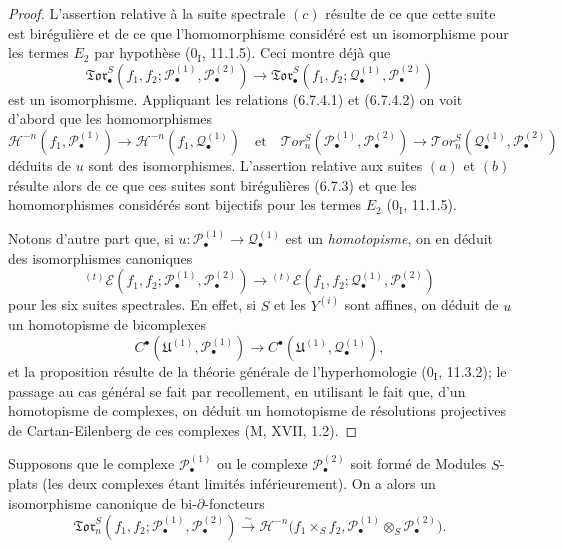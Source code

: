 \begin{proof}
L'assertion relative à la suite spectrale $(c)$ résulte de ce que cette suite
est birégulière et de ce que l'homomorphisme considéré est un isomorphisme pour
les termes $E_2$ par hypothèse ($0_{\mathrm I}$, 11.1.5). Ceci montre déjà que
\[
  \mathfrak{Tor}_\bullet^S
  (f_1,f_2;\mathscr P_\bullet^{(1)},\mathscr P_\bullet^{(2)})
  \longrightarrow
  \mathfrak{Tor}_\bullet^S
  (f_1,f_2;\mathscr Q_\bullet^{(1)},\mathscr P_\bullet^{(2)})
\]
est un isomorphisme. Appliquant les relations (6.7.4.1) et (6.7.4.2) on voit
d'abord que les homomorphismes
\[
  \mathscr H^{-n}(f_1,\mathscr P_\bullet^{(1)})
  \longrightarrow
  \mathscr H^{-n}(f_1,\mathscr Q_\bullet^{(1)})
  \quad\text{et}\quad
  \mathscr{T}\!or_n^S
  (\mathscr P_\bullet^{(1)},\mathscr P_\bullet^{(2)})
  \longrightarrow
  \mathscr{T}\!or_n^S
  (\mathscr Q_\bullet^{(1)},\mathscr P_\bullet^{(2)})
\]
déduits de $u$ sont des isomorphismes. L'assertion relative aux suites $(a)$
et $(b)$ résulte alors de ce que ces suites sont birégulières (6.7.3) et que
les homomorphismes considérés sont bijectifs pour les termes $E_2$
($0_{\mathrm I}$, 11.1.5).

Notons d'autre part que, si
$u:\mathscr P_\bullet^{(1)}\to\mathscr Q_\bullet^{(1)}$ est un
\emph{homotopisme}, on en déduit des isomorphismes canoniques
\[
  {}^{(t)}\mathscr E
  (f_1,f_2;\mathscr P_\bullet^{(1)},\mathscr P_\bullet^{(2)})
  \longrightarrow
  {}^{(t)}\mathscr E
  (f_1,f_2;\mathscr Q_\bullet^{(1)},\mathscr P_\bullet^{(2)})
\]
pour les six suites spectrales. En effet, si $S$ et les $Y^{(i)}$ sont affines,
on déduit de $u$ un homotopisme de bicomplexes
\[
  C^\bullet(\mathfrak U^{(1)},\mathscr P_\bullet^{(1)})
  \longrightarrow
  C^\bullet(\mathfrak U^{(1)},\mathscr Q_\bullet^{(1)}),
\]
et la proposition résulte de la théorie générale de l'hyperhomologie
($0_{\mathrm I}$, 11.3.2); le passage au cas général se fait par recollement,
en utilisant le fait que, d'un homotopisme de complexes, on déduit un
homotopisme de résolutions projectives de Cartan-Eilenberg de ces complexes
(M, XVII, 1.2).
\end{proof}

\begin{proposition}[6.7.6]
Supposons que le complexe $\mathscr P_\bullet^{(1)}$ ou le complexe
$\mathscr P_\bullet^{(2)}$ soit formé de Modules $S$-plats (les deux complexes
étant limités inférieurement). On a alors un isomorphisme canonique de
bi-$\partial$-foncteurs
\[
  \mathfrak{Tor}_n^S
  (f_1,f_2;\mathscr P_\bullet^{(1)},\mathscr P_\bullet^{(2)})
  \xrightarrow{\sim}
  \mathscr H^{-n}\bigl(f_1\times_S f_2,
    \mathscr P_\bullet^{(1)}\otimes_S\mathscr P_\bullet^{(2)}\bigr).
  \tag{6.7.6.1}\label{III.6.7.6.1.fr}
\]
\end{proposition}

